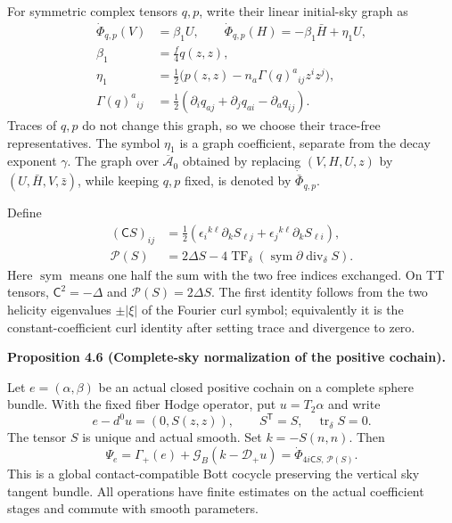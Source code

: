\documentclass[
  english,
  11pt,
  reqno]{amsart}
\makeatletter
\newcommand{\pandocstatementheading}[1]{%
  \par\if@nobreak\else
    \addpenalty{\@beginparpenalty}%
    \addvspace{.5\baselineskip plus .2\baselineskip minus .2\baselineskip}%
  \fi
  {\normalfont\bfseries #1\par}%
  \nobreak\@afterindenttrue\@afterheading
}
\makeatother
\begin{document}
For symmetric complex tensors \(q,p\), write their linear initial-sky
graph as%
 \[
\begin{aligned}
\dot\Phi_{q,p}(V)&=\beta_1U,\qquad
\dot\Phi_{q,p}(H)=-\beta_1\bar H+\eta_1U,\\
\beta_1&=\frac f4q(z,z),\\
\eta_1&=\frac12\bigl(p(z,z)-n_a\Gamma(q)^a{}_{ij}z^iz^j\bigr),\\
\Gamma(q)^a{}_{ij}
&=\frac12(\partial_iq_{aj}+\partial_jq_{ai}-\partial_aq_{ij}).
\end{aligned}
\] Traces of \(q,p\) do not change this graph, so we choose their
trace-free representatives. The symbol \(\eta_1\) is a graph
coefficient, separate from the decay exponent \(\gamma\). The graph over
\(\overline{\mathcal A}_0\) obtained by replacing \((V,H,U,z)\) by
\((U,\bar H,V,\bar z)\), while keeping \(q,p\) fixed, is denoted by
\(\dot{\bar\Phi}_{q,p}\).

Define%
 \[
\begin{aligned}
(\mathsf CS)_{ij}
&=\frac12\left(\epsilon_i{}^{k\ell}\partial_kS_{\ell j}
             +\epsilon_j{}^{k\ell}\partial_kS_{\ell i}\right),\\
\mathcal P(S)
&=2\Delta S-4\operatorname{TF}_\delta
               (\operatorname{sym}\partial\operatorname{div}_\delta S).
\end{aligned}
\] Here \(\operatorname{sym}\) means one half the sum with the two free
indices exchanged. On TT tensors, \(\mathsf C^2=-\Delta\) and
\(\mathcal P(S)=2\Delta S\). The first identity follows from the two
helicity eigenvalues \(\pm|\xi|\) of the Fourier curl symbol;
equivalently it is the constant-coefficient curl identity after setting
trace and divergence to zero.

\pandocstatementheading{\leavevmode{}\label{prop:online-positive-marked-sky-response}Proposition 4.6 (Complete-sky normalization of the positive cochain).}

Let \(e=(\alpha,\beta)\) be an actual closed positive cochain on a
complete sphere bundle. With the fixed fiber Hodge operator, put
\(u=T_2\alpha\) and write \[
e-d^0u=(0,S(z,z)),\qquad S^{\mathsf T}=S,\quad\operatorname{tr}_\delta S=0.
\] The tensor \(S\) is unique and actual smooth. Set \(k=-S(n,n)\). Then%
 \[
\Psi_e=\Gamma_+(e)+\mathcal G_B(k-\mathcal D_+u)
      =\dot\Phi_{4i\mathsf CS,\,\mathcal P(S)}.
\] This is a global contact-compatible Bott cocycle preserving the
vertical sky tangent bundle. All operations have finite estimates on the
actual coefficient stages and commute with smooth parameters.
\end{document}
